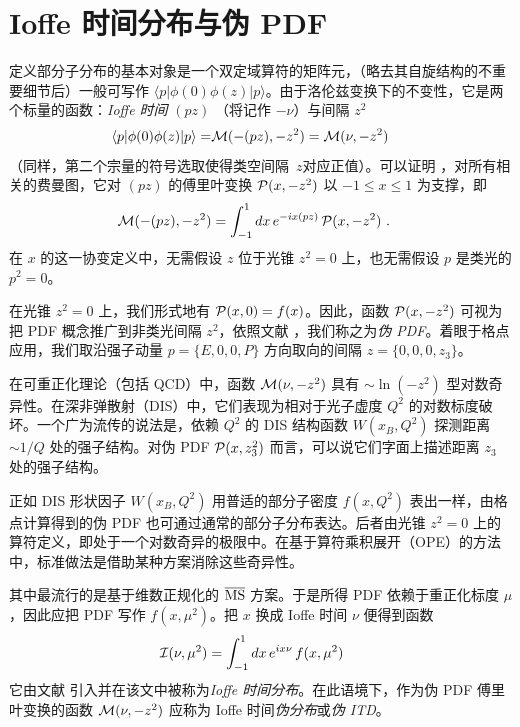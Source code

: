 \section{Ioffe 时间分布与伪 PDF}

定义部分子分布的基本对象是一个双定域算符的矩阵元，（略去其自旋结构的不重要细节后）一般可写作 $\langle  p | \phi (0)  \phi(z)  | p \rangle $。由于洛伦兹变换下的不变性，它是两个标量的函数：{\it Ioffe 时间} $(pz)$ \cite{Ioffe:1969kf}（将记作 $-\nu$）与间隔 $z^2$
  \begin{align}
  \langle p |   \phi(0) \phi (z)|p \rangle
=  & {\cal M} (-(pz), -z^2)  =  {\cal M} (\nu, -z^2)
\,
 \
\label{lorentz}
\end{align}
（同样，第二个宗量的符号选取使得\mbox{类空间隔 $z$}对应正值）。可以证明 \cite{Radyushkin:2016hsy,Radyushkin:1983wh}，对所有相关的费曼图，它对 $(pz)$ 的傅里叶变换 ${\cal P} (x, -z^2)$ 以 $-1 \leq x \leq 1$ 为支撑，即
   \begin{align}
 {\cal M} (-(pz), -z^2)
&   =
 \int_{-1}^1 dx
 \, e^{-i x (pz) } \,  {\cal P} (x, -z^2)  \   .
  \label{MPD}
\end{align}
在 $x$ 的这一协变定义中，无需假设 $z$ 位于光锥 $z^2=0$ 上，也无需假设 $p$ 是类光的 $p^2=0$。

在光锥 $z^2=0$ 上，我们形式地有 \mbox{${\cal P} (x, 0) =f(x) $}。因此，函数 ${\cal P} (x, -z^2) $ 可视为把 PDF 概念推广到非类光间隔 $z^2$，依照文献 \cite{Radyushkin:2017cyf}，我们称之为{\it 伪 PDF}。着眼于格点应用，我们取沿强子动量 $p=\{E,0,0,P\}$ 方向取向的间隔 $z=\{0,0,0,z_3\}$。

在可重正化理论（包括 QCD）中，函数 ${\cal M} (\nu, -z^2) $ 具有 $\sim \ln (-z^2)$ 型对数奇异性。在深非弹散射（DIS）中，它们表现为相对于光子虚度 $Q^2$ 的对数标度破坏。一个广为流传的说法是，依赖 $Q^2$ 的 DIS 结构函数 $W(x_B,Q^2)$ 探测距离 $\sim 1/Q$ 处的强子结构。对伪 PDF ${\cal P} (x,z_3^2)$ 而言，可以说它们字面上描述距离 $z_3$ 处的强子结构。

正如 DIS 形状因子 $W(x_B,Q^2)$ 用普适的部分子密度 $f(x, Q^2)$ 表出一样，由格点计算得到的伪 PDF 也可通过通常的部分子分布表达。后者由光锥 $z^2=0$ 上的算符定义，即处于一个对数奇异的极限中。在基于算符乘积展开（OPE）的方法中，标准做法是借助某种方案消除这些奇异性。

其中最流行的是基于维数正规化的 $\overline{\rm MS}$ 方案。于是所得 PDF 依赖于重正化标度 $\mu$，因此应把 PDF 写作 $f(x, \mu^2)$。把 $x$ 换成 Ioffe 时间 $\nu$ 便得到函数
 \begin{align}
 {\cal I} (\nu, \mu^2)
&   =
 \int_{-1}^1 dx
 \, e^{i x \nu  } \,  f (x, \mu^2)  \
  \label{ITD}
\end{align}
它由文献 \cite{Braun:1994jq} 引入并在该文中被称为{\it Ioffe 时间分布}。在此语境下，作为伪 PDF 傅里叶变换的函数 ${\cal M}(\nu , -z^2) $ 应称为 Ioffe 时间{\it 伪分布}或{\it 伪 ITD}。

